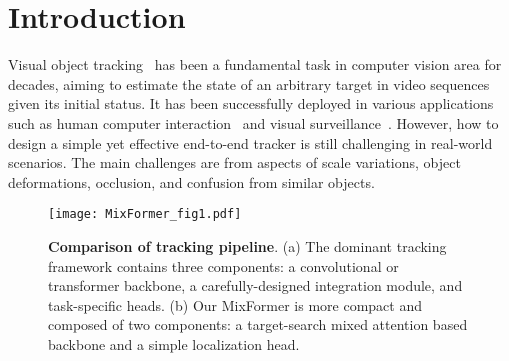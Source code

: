 \section{Introduction}

Visual object tracking~\cite{updt,mdnet,dcf_,CRPN,bacf,updt,staple,vital} has been a fundamental task in computer vision area for decades, aiming to estimate the state of an arbitrary target in video sequences given its initial status. It has been successfully deployed in various applications such as human computer interaction~\cite{introduction1} and visual surveillance~\cite{introduction2}. However, how to design a simple yet effective end-to-end tracker is still challenging in real-world scenarios. The main challenges are from aspects of scale variations, object deformations, occlusion, and confusion from similar objects.

\begin{figure}[t]
\centering
\texttt{[image: MixFormer\_fig1.pdf]}
\caption{{\bf Comparison of tracking pipeline}. (a) The dominant tracking framework contains three components: a convolutional or transformer backbone, a carefully-designed integration module, and task-specific heads. (b) Our MixFormer is more compact and composed of two components: a target-search mixed attention based backbone and a simple localization head. 
}
\vspace{-3mm}
\label{fig:motivation}
\end{figure}

